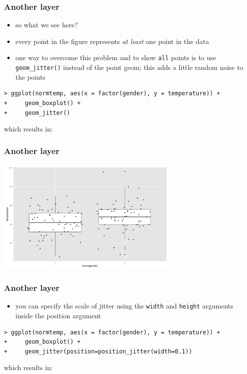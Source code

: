 \documentclass[xcolor={table}]{beamer}
\begin{document}
\begin{frame}[fragile]\frametitle{Another layer}
  \begin{itemize}
  \item so what we see here?
  \item every point in the figure represents \textit{at least} one point in the data
  \item one way to overcome this problem and to show \texttt{all} points is to use \texttt{geom\_jitter()} instead of the point geom; this adds a little random noise to the points
  \end{itemize}\small
\begin{verbatim}
> ggplot(normtemp, aes(x = factor(gender), y = temperature)) +
+     geom_boxplot() +
+     geom_jitter()  
\end{verbatim}
which results in:
\end{frame}

\begin{frame}\frametitle{Another layer}
  \begin{center}
    \includegraphics[width=9cm]{boxplotjitter.png}
  \end{center}
\end{frame}

\begin{frame}[fragile]\frametitle{Another layer}
  \begin{itemize}
  \item you can specify the scale of jitter using the \texttt{width} and \texttt{height} arguments inside the position argument
  \end{itemize}\small
\begin{verbatim}
> ggplot(normtemp, aes(x = factor(gender), y = temperature)) +
+     geom_boxplot() +
+     geom_jitter(position=position_jitter(width=0.1))
\end{verbatim}
which results in:
\end{frame}
\end{document}
